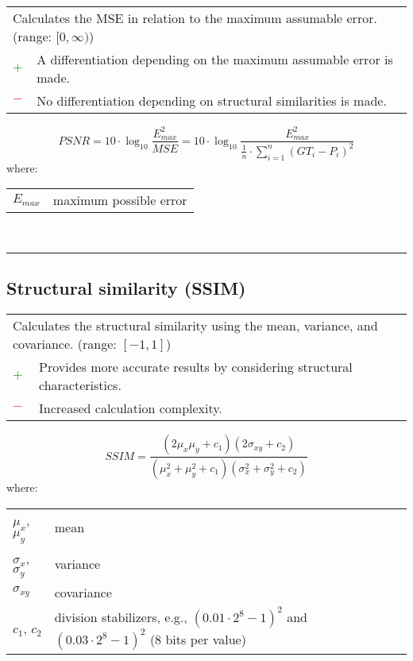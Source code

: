 \documentclass{article}
\makeatletter
\newenvironment{conditions}[1][where:]
	{\hspace{0.02\textwidth} #1 \begin{tabular}[t]{>{$}l<{$} @{${}={}$} l}}
	{\end{tabular}\\[\belowdisplayskip]}
\makeatother
\begin{document}
\begin{table}[H]\centering
	\begin{tabular}{m{}m{}}
		\multicolumn{2}{m{0.95\textwidth}}{Calculates the MSE in relation to the maximum assumable error. (range: $[0, \infty)$)} \\
		\textcolor{Green}{$+$} & A differentiation depending on the maximum assumable error is made. \\
		\textcolor{Red}{$-$}   & No differentiation depending on structural similarities is made.
	\end{tabular}
\end{table}

\begin{equation}
	\textit{PSNR} = 10 \cdot \log_{10} \dfrac{E_\textit{max}^2}{\textit{MSE}} = 10 \cdot \log_{10} \dfrac{E_\textit{max}^2}{\frac{1}{n} \cdot \sum\nolimits_{i = 1}^n (\textit{GT}_i - P_i)^2}
%
	\label{equation:PSNR}
\end{equation}
%
\begin{conditions}
	E_\textit{max} & maximum possible error
\end{conditions}

\hrule


\subsection[Structural similarity (SSIM)]{Structural similarity (SSIM) \cite{wang2004image, ghodrati2019mr}}

\begin{table}[H]\centering
	\begin{tabular}{m{}m{}}
		\multicolumn{2}{m{0.95\textwidth}}{Calculates the structural similarity using the mean, variance, and covariance. (range: $[-1, 1]$)} \\
		\textcolor{Green}{$+$} & Provides more accurate results by considering structural characteristics. \cite{wang2004image} \\
		\textcolor{Red}{$-$}   & Increased calculation complexity.
	\end{tabular}
\end{table}

\begin{equation}
	\textit{SSIM} = \dfrac{(2 \mu_x \mu_y + c_1) (2 \sigma_{xy} + c_2)}{(\mu_x^2 + \mu_y^2 + c_1) (\sigma_x^2 + \sigma_y^2 + c_2)}
%
	\label{equation:SSIM}
\end{equation}
%
\begin{conditions}
	\mu_x$, $\mu_y       & mean       \\
	\sigma_x$, $\sigma_y & variance   \\
	\sigma_{xy}          & covariance \\
	c_1$, $c_2           & division stabilizers, e.g., $(0.01 \cdot 2^8 - 1)^2$ and $(0.03 \cdot 2^8 - 1)^2$ (8 bits per value)
\end{conditions}
\end{document}
